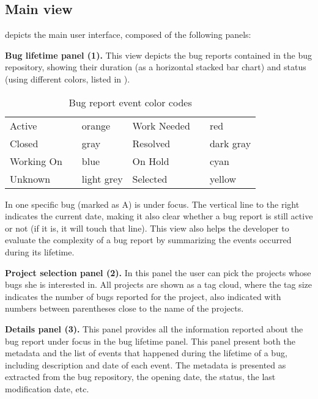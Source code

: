 \subsection{Main view}\label{main-view}

 depicts the main user interface, composed of the following panels:

{\bf Bug lifetime panel (1).} \label{bug-lifetime-panel} This view depicts the bug reports contained in the bug repository, showing their duration (as a horizontal stacked bar chart) and status (using different colors, listed in ). 

\begin{table}[ht]
\center
\caption{Bug report event color codes}
\label{tab-colors}
\begin{tabular}{p{1.4cm} p{0.1cm} p{1.3cm} | p{1.4cm} p{0.1cm} p{1.2cm} } \hline
Active & \cellcolor{active} & orange & Work Needed & \cellcolor{work needed} & red \\
Closed & \cellcolor{closed} & gray & Resolved & \cellcolor{resolved} & dark gray \\
Working On & \cellcolor{working on} & blue & On Hold & \cellcolor{on hold} & cyan \\
Unknown & \cellcolor{unknown} & light grey & Selected & \cellcolor{yellow} & yellow \\ \hline
\end{tabular}
\end{table}

In  one specific bug (marked as A) is under focus. The vertical line to the right indicates the current date, making it also clear whether a bug report is still active or not (if it is, it will touch that line). This view also helps the developer to evaluate the complexity of a bug report by summarizing the events occurred during its lifetime.

{\bf Project selection panel (2).} In this panel the user can pick the projects whose bugs she is interested in. All projects are shown as a tag cloud, where the tag size indicates the number of bugs reported for the project, also indicated with numbers between parentheses close to the name of the projects. 

{\bf Details panel (3).} This panel provides all the information reported about the bug report under focus in the bug lifetime panel. This panel present both the metadata and the list of events that happened during the lifetime of a bug, including description and date of each event. The metadata is presented as extracted from the bug repository, \eg the opening date, the status, the last modification date, etc.

